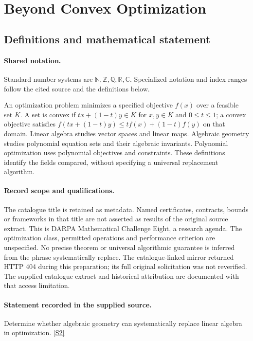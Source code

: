 \documentclass[11pt]{article}
\newcommand{\sref}[2]{\hyperlink{source:#1:#2}{[S#2]}}
\begin{document}
\section{Beyond Convex Optimization}\label{statement}

\subsection{Definitions and mathematical statement}

\paragraph{Shared notation.}Standard number systems are $\mathbb N,\mathbb Z,\mathbb Q,\mathbb R,\mathbb C$. Specialized notation and index ranges follow the cited source and the definitions below.


An optimization problem minimizes a specified objective $f(x)$ over a feasible set $K$. A set is convex if $tx+(1-t)y\in K$ for $x,y\in K$ and $0\leq t\leq1$; a convex objective satisfies $f(tx+(1-t)y)\leq tf(x)+(1-t)f(y)$ on that domain. Linear algebra studies vector spaces and linear maps. Algebraic geometry studies polynomial equation sets and their algebraic invariants. Polynomial optimization uses polynomial objectives and constraints. These definitions identify the fields compared, without specifying a universal replacement algorithm.
\paragraph{Record scope and qualifications.}
The catalogue title is retained as metadata. Named certificates, contracts, bounds or frameworks in that title are not asserted as results of the original source extract.
This is DARPA Mathematical Challenge Eight, a research agenda. The optimization class, permitted operations and performance criterion are unspecified. No precise theorem or universal algorithmic guarantee is inferred from the phrase systematically replace. The catalogue-linked mirror returned HTTP 404 during this preparation; its full original solicitation was not reverified. The supplied catalogue extract and historical attribution are documented with that access limitation.
\paragraph{Statement recorded in the supplied source.}
Determine whether algebraic geometry can systematically replace linear algebra in optimization. \sref{statement}{2}
\end{document}
